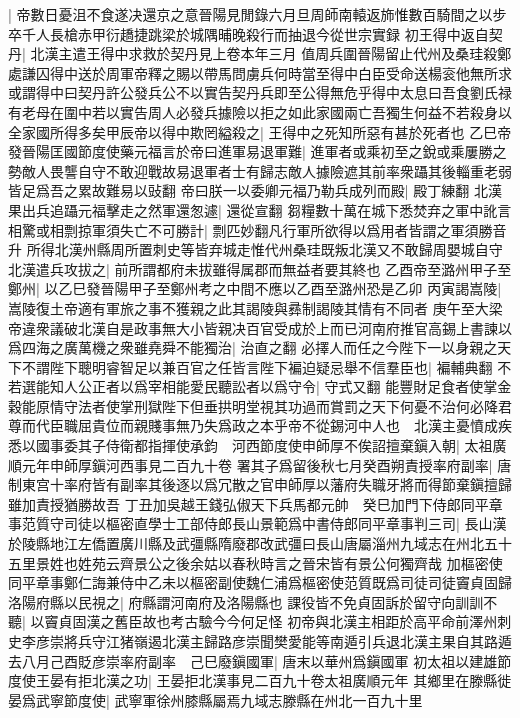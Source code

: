 |{
	帝數日憂沮不食遂决還京之意晉陽見閒錄六月旦周師南轅返斾惟數百騎間之以步卒千人長槍赤甲衍趫捷跳梁於城隅晡晚殺行而抽退今從世宗實録}
初王得中返自契丹|{
	北漢主遣王得中求救於契丹見上卷本年三月}
值周兵圍晉陽留止代州及桑珪殺鄭處謙囚得中送於周軍帝釋之賜以帶馬問虜兵何時當至得中白臣受命送楊衮他無所求或謂得中曰契丹許公發兵公不以實告契丹兵即至公得無危乎得中太息曰吾食劉氏禄有老母在圍中若以實告周人必發兵據險以拒之如此家國兩亡吾獨生何益不若殺身以全家國所得多矣甲辰帝以得中欺罔縊殺之|{
	王得中之死知所惡有甚於死者也}
乙巳帝發晉陽匡國節度使藥元福言於帝曰進軍易退軍難|{
	進軍者或乘初至之銳或乘屢勝之勢敵人畏讋自守不敢迎戰故易退軍者士有歸志敵人據險遮其前率衆躡其後輜重老弱皆足爲吾之累故難易以䜴翻}
帝曰朕一以委卿元福乃勒兵成列而殿|{
	殿丁練翻}
北漢果出兵追躡元福擊走之然軍還怱遽|{
	還從宣翻}
芻糧數十萬在城下悉焚弃之軍中訛言相驚或相剽掠軍須失亡不可勝計|{
	剽匹妙翻凡行軍所欲得以爲用者皆謂之軍須勝音升}
所得北漢州縣周所置刺史等皆弃城走惟代州桑珪既叛北漢又不敢歸周嬰城自守北漢遣兵攻拔之|{
	前所謂都府未拔雖得属郡而無益者要其終也}
乙酉帝至潞州甲子至鄭州|{
	以乙巳發晉陽甲子至鄭州考之中間不應以乙酉至潞州恐是乙卯}
丙寅謁嵩陵|{
	嵩陵復土帝適有軍旅之事不獲親之此其謁陵與彞制謁陵其情有不同者}
庚午至大梁　帝違衆議破北漢自是政事無大小皆親决百官受成於上而已河南府推官高錫上書諫以爲四海之廣萬機之衆雖堯舜不能獨治|{
	治直之翻}
必擇人而任之今陛下一以身親之天下不謂陛下聰明睿智足以兼百官之任皆言陛下褊迫疑忌舉不信羣臣也|{
	褊輔典翻}
不若選能知人公正者以爲宰相能愛民聽訟者以爲守令|{
	守式又翻}
能豐財足食者使掌金穀能原情守法者使掌刑獄陛下但垂拱明堂視其功過而賞罰之天下何憂不治何必降君尊而代臣職屈貴位而親賤事無乃失爲政之本乎帝不從錫河中人也　北漢主憂憤成疾悉以國事委其子侍衛都指揮使承鈞　河西節度使申師厚不俟詔擅棄鎭入朝|{
	太祖廣順元年申師厚鎭河西事見二百九十卷}
署其子爲留後秋七月癸酉朔責授率府副率|{
	唐制東宫十率府皆有副率其後逐以爲冗散之官申師厚以藩府失職牙將而得節棄鎭擅歸雖加責授猶勝故吾}
丁丑加吳越王錢弘俶天下兵馬都元帥　癸巳加門下侍郎同平章事范質守司徒以樞密直學士工部侍郎長山景範爲中書侍郎同平章事判三司|{
	長山漢於陵縣地江左僑置廣川縣及武彊縣隋廢郡改武彊曰長山唐屬淄州九域志在州北五十五里景姓也姓苑云齊景公之後余姑以春秋時言之晉宋皆有景公何獨齊哉}
加樞密使同平章事鄭仁誨兼侍中乙未以樞密副使魏仁浦爲樞密使范質既爲司徒司徒竇貞固歸洛陽府縣以民視之|{
	府縣謂河南府及洛陽縣也}
課役皆不免貞固訴於留守向訓訓不聽|{
	以竇貞固漢之舊臣故也考古驗今今何足怪}
初帝與北漢主相距於高平命前澤州刺史李彦崇將兵守江猪嶺遏北漢主歸路彦崇聞樊愛能等南遁引兵退北漢主果自其路遁去八月己酉貶彦崇率府副率　己巳廢鎭國軍|{
	唐末以華州爲鎭國軍}
初太祖以建雄節度使王晏有拒北漢之功|{
	王晏拒北漢事見二百九十卷太祖廣順元年}
其鄉里在滕縣徙晏爲武寧節度使|{
	武寧軍徐州膝縣屬焉九域志滕縣在州北一百九十里}
